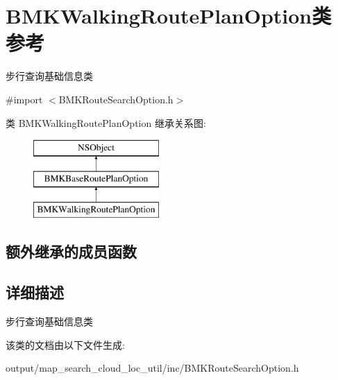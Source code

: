 \hypertarget{interface_b_m_k_walking_route_plan_option}{\section{B\+M\+K\+Walking\+Route\+Plan\+Option类 参考}
\label{interface_b_m_k_walking_route_plan_option}
}


步行查询基础信息类  




{\ttfamily \#import $<$B\+M\+K\+Route\+Search\+Option.\+h$>$}

类 B\+M\+K\+Walking\+Route\+Plan\+Option 继承关系图\+:\begin{figure}[H]
\begin{center}
\leavevmode
\includegraphics[height=3.000000cm]{interface_b_m_k_walking_route_plan_option}
\end{center}
\end{figure}
\subsection*{额外继承的成员函数}


\subsection{详细描述}
步行查询基础信息类 

该类的文档由以下文件生成\+:\begin{DoxyCompactItemize}
\item 
output/map\+\_\+search\+\_\+cloud\+\_\+loc\+\_\+util/inc/B\+M\+K\+Route\+Search\+Option.\+h\end{DoxyCompactItemize}
